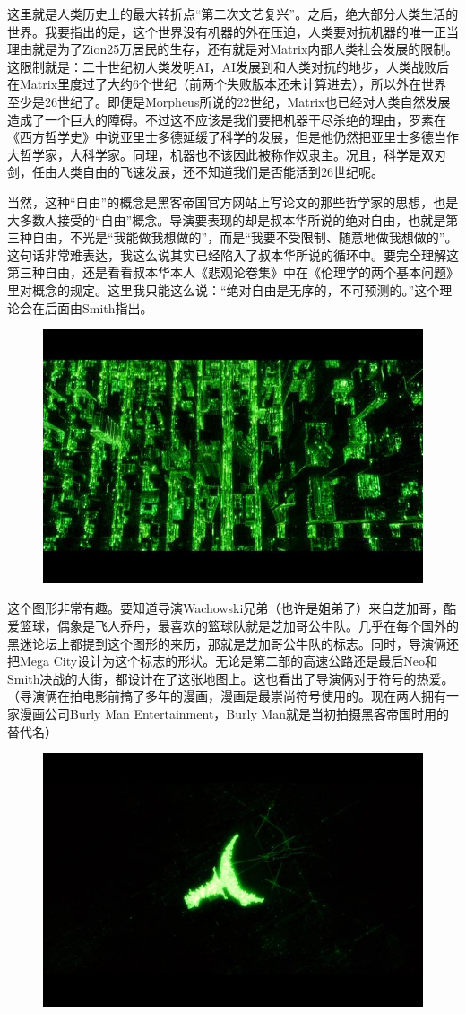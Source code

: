 \documentclass[UTF8]{ctexart}
\begin{document}
这里就是人类历史上的最大转折点“第二次文艺复兴”。之后，绝大部分人类生活的世界。我要指出的是，这个世界没有机器的外在压迫，人类要对抗机器的唯一正当理由就是为了Zion25万居民的生存，还有就是对Matrix内部人类社会发展的限制。这限制就是：二十世纪初人类发明AI，AI发展到和人类对抗的地步，人类战败后在Matrix里度过了大约6个世纪（前两个失败版本还未计算进去），所以外在世界至少是26世纪了。即便是Morpheus所说的22世纪，Matrix也已经对人类自然发展造成了一个巨大的障碍。不过这不应该是我们要把机器干尽杀绝的理由，罗素在《西方哲学史》中说亚里士多德延缓了科学的发展，但是他仍然把亚里士多德当作大哲学家，大科学家。同理，机器也不该因此被称作奴隶主。况且，科学是双刃剑，任由人类自由的飞速发展，还不知道我们是否能活到26世纪呢。

当然，这种“自由”的概念是黑客帝国官方网站上写论文的那些哲学家的思想，也是大多数人接受的“自由”概念。导演要表现的却是叔本华所说的绝对自由，也就是第三种自由，不光是“我能做我想做的”，而是“我要不受限制、随意地做我想做的”。这句话非常难表达，我这么说其实已经陷入了叔本华所说的循环中。要完全理解这第三种自由，还是看看叔本华本人《悲观论卷集》中在《伦理学的两个基本问题》里对概念的规定。这里我只能这么说：“绝对自由是无序的，不可预测的。”这个理论会在后面由Smith指出。

\begin{figure}[htb]
\centering
\includegraphics[width=0.5\linewidth]{fig/1f716227f5c2fe03918f9d11.jpg}
\end{figure}

这个图形非常有趣。要知道导演Wachowski兄弟（也许是姐弟了）来自芝加哥，酷爱篮球，偶象是飞人乔丹，最喜欢的篮球队就是芝加哥公牛队。几乎在每个国外的黑迷论坛上都提到这个图形的来历，那就是芝加哥公牛队的标志。同时，导演俩还把Mega City设计为这个标志的形状。无论是第二部的高速公路还是最后Neo和Smith决战的大街，都设计在了这张地图上。这也看出了导演俩对于符号的热爱。（导演俩在拍电影前搞了多年的漫画，漫画是最崇尚符号使用的。现在两人拥有一家漫画公司Burly Man Entertainment，Burly Man就是当初拍摄黑客帝国时用的替代名）

\begin{figure}[htb]
\centering
\includegraphics[width=0.5\linewidth]{fig/245732fa9999af1ea8d31110.jpg}
\end{figure}
\end{document}
